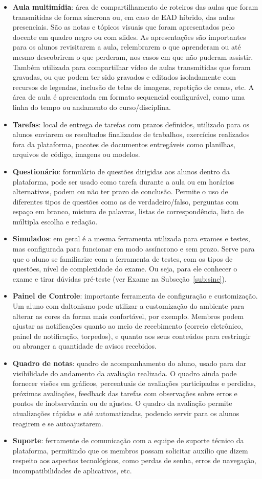 \begin{itemize}
\item \textbf{Aula multimídia}: área de compartilhamento de roteiros das aulas que foram transmitidas de forma síncrona ou, em caso de EAD híbrido, das aulas presenciais. São as notas e tópicos visuais que foram apresentados pelo docente em quadro negro ou com slides. As apresentações são importantes para os alunos revisitarem a aula, relembrarem o que aprenderam ou até mesmo descobrirem o que perderam, nos casos em que não puderam assistir. Também utilizada para compartilhar vídeo de aulas transmitidas que foram gravadas, ou que podem ter sido gravados e editados isoladamente com recursos de legendas, inclusão de telas de imagens, repetição de cenas, etc. A área de aula é apresentada em formato sequencial configurável, como uma linha do tempo ou andamento do curso/disciplina.
\item \textbf{Tarefas}: local de entrega de tarefas com prazos definidos, utilizado para os alunos enviarem os resultados finalizados de trabalhos, exercícios realizados fora da plataforma, pacotes de documentos entregáveis como planilhas, arquivos de código, imagens ou modelos. 
\item \textbf{Questionário}: formulário de questões dirigidas aos alunos dentro da plataforma, pode ser usado como tarefa durante a aula ou em horários alternativos, podem ou não ter prazo de conclusão. Permite o uso de diferentes tipos de questões como as de verdadeiro/falso, perguntas com espaço em branco, mistura de palavras, listas de correspondência, lista de múltipla escolha e redação.  
\item \textbf{Simulados}: em geral é a mesma ferramenta utilizada para exames e testes, mas configurada para funcionar em modo assíncrono e sem prazo. Serve para que o aluno se familiarize com a ferramenta de testes, com os tipos de questões, nível de complexidade do exame. Ou seja, para ele conhecer o exame e tirar dúvidas pré-teste (ver Exame na Subseção~\ref{sub:sinc}).
\item \textbf{Painel de Controle}: importante ferramenta de configuração e customização. Um aluno com daltonismo pode utilizar a customização do ambiente para alterar as cores da forma mais confortável, por exemplo. Membros podem ajustar as notificações quanto ao meio de recebimento (correio eletrônico, painel de notificação, torpedos), e quanto aos seus conteúdos para restringir ou abranger a quantidade de avisos recebidos. 
\item \textbf{Quadro de notas}: quadro de acompanhamento do aluno, usado para dar visibilidade do andamento da avaliação realizada. O quadro ainda pode fornecer visões em gráficos, percentuais de avaliações participadas e perdidas, próximas avaliações, feedback das tarefas com observações sobre erros e pontos de inobservância ou de ajustes. O quadro da avaliação permite atualizações rápidas e até automatizadas, podendo  servir para os alunos reagirem e se autoajustarem.
\item \textbf{Suporte}:  ferramente de comunicação com a equipe de suporte técnico da plataforma, permitindo que os membros possam solicitar auxílio que dizem respeito aos aspectos tecnológicos, como perdas de senha, erros de navegação, incompatibilidades de aplicativos, etc.
\end{itemize}
